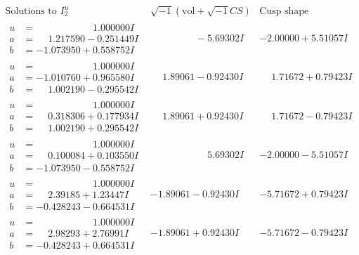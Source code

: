 \documentclass[1p]{elsarticle_modified}
\theoremstyle{definition}
\newcommand{\I}{\sqrt{-1}}
\begin{document}
$$\begin{array}{c|c|c}  
\text{Solutions to }I^u_{2}& \I (\text{vol} + \sqrt{-1}CS) & \text{Cusp shape}\\
 \hline 
\begin{aligned}
u &= \phantom{-0.000000 -}1.000000 I \\
a &= \phantom{-}1.217590 - 0.251449 I \\
b &= -1.073950 + 0.558752 I\end{aligned}
 & \phantom{-0.000000 } -5.69302 I & -2.00000 + 5.51057 I \\ \hline\begin{aligned}
u &= \phantom{-0.000000 -}1.000000 I \\
a &= -1.010760 + 0.965580 I \\
b &= \phantom{-}1.002190 - 0.295542 I\end{aligned}
 & \phantom{-}1.89061 - 0.92430 I & \phantom{-}1.71672 + 0.79423 I \\ \hline\begin{aligned}
u &= \phantom{-0.000000 -}1.000000 I \\
a &= \phantom{-}0.318306 + 0.177934 I \\
b &= \phantom{-}1.002190 + 0.295542 I\end{aligned}
 & \phantom{-}1.89061 + 0.92430 I & \phantom{-}1.71672 - 0.79423 I \\ \hline\begin{aligned}
u &= \phantom{-0.000000 -}1.000000 I \\
a &= \phantom{-}0.100084 + 0.103550 I \\
b &= -1.073950 - 0.558752 I\end{aligned}
 & \phantom{-0.000000 -}5.69302 I & -2.00000 - 5.51057 I \\ \hline\begin{aligned}
u &= \phantom{-0.000000 -}1.000000 I \\
a &= \phantom{-}2.39185 + 1.23447 I \\
b &= -0.428243 - 0.664531 I\end{aligned}
 & -1.89061 - 0.92430 I & -5.71672 + 0.79423 I \\ \hline\begin{aligned}
u &= \phantom{-0.000000 -}1.000000 I \\
a &= \phantom{-}2.98293 + 2.76991 I \\
b &= -0.428243 + 0.664531 I\end{aligned}
 & -1.89061 + 0.92430 I & -5.71672 - 0.79423 I \\ \hline\begin{aligned}

\end{aligned}
\end{array}$$
\end{document}
